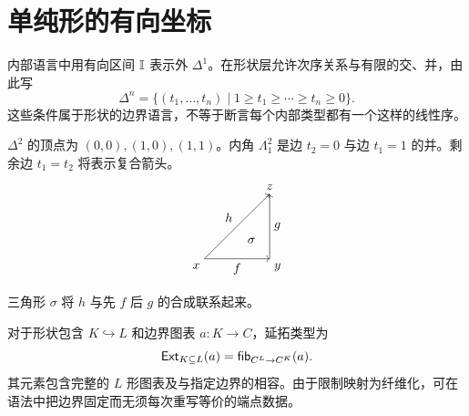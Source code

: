 \section{单纯形的有向坐标}
\begin{definition}[有向区间与形状]
内部语言中用有向区间 $\mathbb I$ 表示外 $\Delta^1$。在形状层允许次序关系与有限的交、并，由此写
\[
\Delta^n=\{(t_1,\ldots,t_n)\mid
1\ge t_1\ge\cdots\ge t_n\ge0\}.
\]
这些条件属于形状的边界语言，不等于断言每个内部类型都有一个这样的线性序。
\end{definition}
\begin{example}
$\Delta^2$ 的顶点为 $(0,0),(1,0),(1,1)$。内角 $\Lambda_1^2$ 是边 $t_2=0$ 与边 $t_1=1$ 的并。剩余边 $t_1=t_2$ 将表示复合箭头。
\[
\begin{tikzpicture}[scale=1.8]
\draw[->] (0,0)--(1,0) node[midway,below]{$f$};
\draw[->] (1,0)--(1,1) node[midway,right]{$g$};
\draw[->] (0,0)--(1,1) node[midway,above left]{$h$};
\node[below left] at (0,0){$x$};\node[below right] at (1,0){$y$};\node[above] at (1,1){$z$};
\node at (.72,.28){$\sigma$};
\end{tikzpicture}
\]
三角形 $\sigma$ 将 $h$ 与先 $f$ 后 $g$ 的合成联系起来。
\end{example}
\begin{definition}[延拓类型]
对于形状包含 $K\hookrightarrow L$ 和边界图表 $a:K\to C$，延拓类型为
\[
\mathsf{Ext}_{K\subseteq L}(a)
=\mathsf{fib}_{C^L\to C^K}(a).
\]
其元素包含完整的 $L$ 形图表及与指定边界的相容。由于限制映射为纤维化，可在语法中把边界固定而无须每次重写等价的端点数据。
\end{definition}
